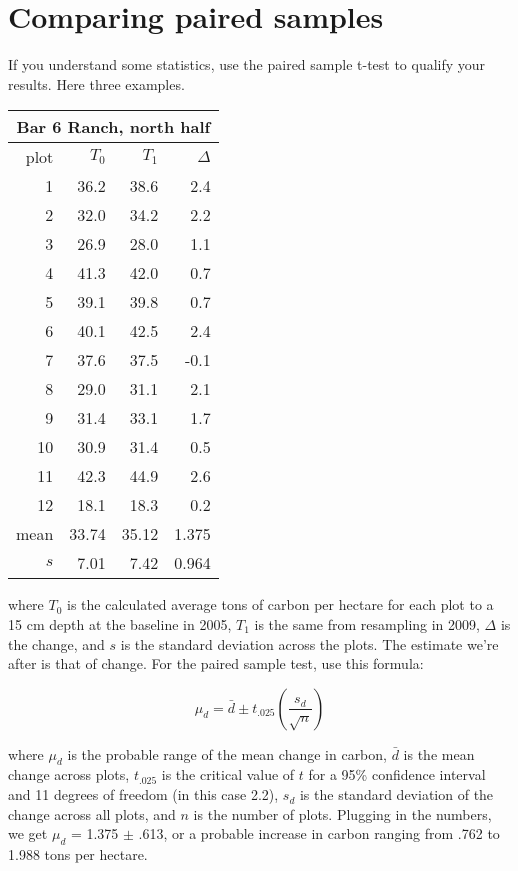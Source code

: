 \documentclass[11pt,letterpaper,oneside,onecolumn]{memoir}
\begin{document}
\section{Comparing paired samples}

If you understand some statistics, use the paired sample t-test to qualify your results. Here three examples.

\begin{center}
\begin{tabular}{|r|r|r|r|}
\multicolumn{4}{c}{\textbf{Bar 6 Ranch, north half}}\label{bar6}\\ \hline
plot&$T_{0}$&$T_{1}$&$\Delta$\\ \hline\hline
1& 36.2& 38.6& 2.4\\ \hline
2& 32.0& 34.2& 2.2\\ \hline
3& 26.9& 28.0& 1.1\\ \hline
4& 41.3& 42.0& 0.7\\ \hline
5& 39.1& 39.8& 0.7\\ \hline
6& 40.1& 42.5& 2.4\\ \hline
7& 37.6& 37.5& -0.1\\ \hline
8& 29.0& 31.1& 2.1\\ \hline
9& 31.4& 33.1& 1.7\\ \hline
10& 30.9& 31.4& 0.5\\ \hline
11& 42.3& 44.9& 2.6\\ \hline
12& 18.1& 18.3& 0.2\\ \hline\hline
mean& 33.74& 35.12&1.375 \\ \hline
$s$& 7.01& 7.42& 0.964\\ \hline

\end{tabular}
\end{center}

\noindent where $T_{0}$ is the calculated average tons of carbon per hectare for each plot to a 15 cm depth at the baseline in 2005, $T_{1}$ is the same from resampling in 2009, $\Delta$ is the change, and $s$ is the standard deviation across the plots. The estimate we're after is that of change. For the paired sample test, use this formula:

\begin{equation}\mu_{d} = \bar{d} \pm t_{.025}\left(\frac{s_{d}}{\sqrt{n}} \right)\end{equation}

\noindent where $\mu_{d}$ is the probable range of the mean change in carbon, $\bar{d}$ is the mean change across plots, $t_{.025}$ is the critical value of $t$ for a 95\% confidence interval and 11 degrees of freedom (in this case 2.2), $s_{d}$ is the standard deviation of the change across all plots, and $n$ is the number of plots. Plugging in the numbers, we get $\mu_{d}$ = 1.375 $\pm$ .613, or a probable increase in carbon ranging from .762 to 1.988 tons per hectare.
\end{document}
